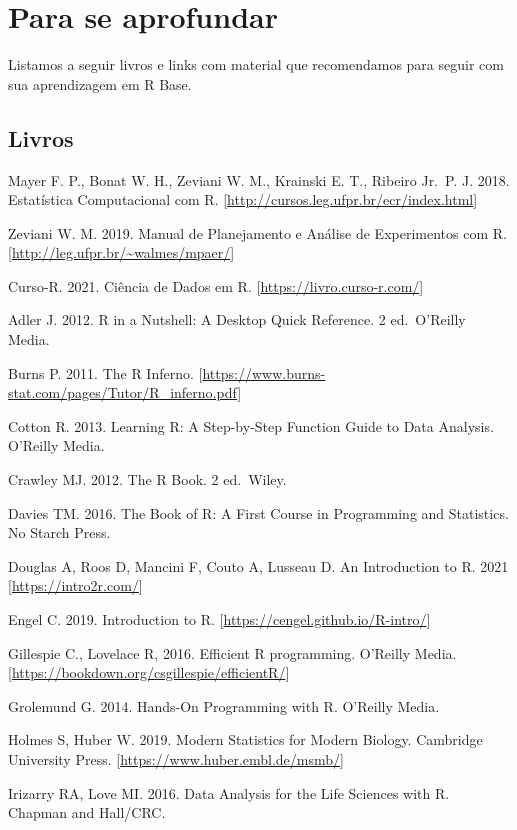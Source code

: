 \documentclass[
]{book}
\begin{document}
\hypertarget{para-se-aprofundar}{%
\section{Para se aprofundar}\label{para-se-aprofundar}}

Listamos a seguir livros e links com material que recomendamos para seguir com sua aprendizagem em R Base.

\hypertarget{livros}{%
\subsection{Livros}\label{livros}}

Mayer F. P., Bonat W. H., Zeviani W. M., Krainski E. T., Ribeiro Jr.~P. J. 2018. Estatística Computacional com R. {[}\url{http://cursos.leg.ufpr.br/ecr/index.html}{]}

Zeviani W. M. 2019. Manual de Planejamento e Análise de Experimentos com R. {[}\url{http://leg.ufpr.br/~walmes/mpaer/}{]}

Curso-R. 2021. Ciência de Dados em R. {[}\url{https://livro.curso-r.com/}{]}

Adler J. 2012. R in a Nutshell: A Desktop Quick Reference. 2 ed.~O'Reilly Media.

Burns P. 2011. The R Inferno. {[}\url{https://www.burns-stat.com/pages/Tutor/R_inferno.pdf}{]}

Cotton R. 2013. Learning R: A Step-by-Step Function Guide to Data Analysis. O'Reilly Media.

Crawley MJ. 2012. The R Book. 2 ed.~Wiley.

Davies TM. 2016. The Book of R: A First Course in Programming and Statistics. No Starch Press.

Douglas A, Roos D, Mancini F, Couto A, Lusseau D. An Introduction to R. 2021 {[}\url{https://intro2r.com/}{]}

Engel C. 2019. Introduction to R. {[}\url{https://cengel.github.io/R-intro/}{]}

Gillespie C., Lovelace R, 2016. Efficient R programming. O'Reilly Media. {[}\url{https://bookdown.org/csgillespie/efficientR/}{]}

Grolemund G. 2014. Hands-On Programming with R. O'Reilly Media.

Holmes S, Huber W. 2019. Modern Statistics for Modern Biology. Cambridge University Press. {[}\url{https://www.huber.embl.de/msmb/}{]}

Irizarry RA, Love MI. 2016. Data Analysis for the Life Sciences with R. Chapman and Hall/CRC.
\end{document}
